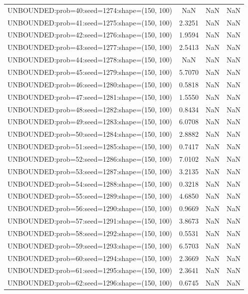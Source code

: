 \begin{longtable}{lccc}
UNBOUNDED:prob=40:seed=1274:shape=(150, 100)  &     NaN &   NaN &    NaN \\
UNBOUNDED:prob=41:seed=1275:shape=(150, 100)  &  2.3251 &   NaN &    NaN \\
UNBOUNDED:prob=42:seed=1276:shape=(150, 100)  &  1.9594 &   NaN &    NaN \\
UNBOUNDED:prob=43:seed=1277:shape=(150, 100)  &  2.5413 &   NaN &    NaN \\
UNBOUNDED:prob=44:seed=1278:shape=(150, 100)  &     NaN &   NaN &    NaN \\
UNBOUNDED:prob=45:seed=1279:shape=(150, 100)  &  5.7070 &   NaN &    NaN \\
UNBOUNDED:prob=46:seed=1280:shape=(150, 100)  &  0.5818 &   NaN &    NaN \\
UNBOUNDED:prob=47:seed=1281:shape=(150, 100)  &  1.5550 &   NaN &    NaN \\
UNBOUNDED:prob=48:seed=1282:shape=(150, 100)  &  0.8434 &   NaN &    NaN \\
UNBOUNDED:prob=49:seed=1283:shape=(150, 100)  &  6.0708 &   NaN &    NaN \\
UNBOUNDED:prob=50:seed=1284:shape=(150, 100)  &  2.8882 &   NaN &    NaN \\
UNBOUNDED:prob=51:seed=1285:shape=(150, 100)  &  0.7417 &   NaN &    NaN \\
UNBOUNDED:prob=52:seed=1286:shape=(150, 100)  &  7.0102 &   NaN &    NaN \\
UNBOUNDED:prob=53:seed=1287:shape=(150, 100)  &  3.2135 &   NaN &    NaN \\
UNBOUNDED:prob=54:seed=1288:shape=(150, 100)  &  0.3218 &   NaN &    NaN \\
UNBOUNDED:prob=55:seed=1289:shape=(150, 100)  &  4.6850 &   NaN &    NaN \\
UNBOUNDED:prob=56:seed=1290:shape=(150, 100)  &  0.9669 &   NaN &    NaN \\
UNBOUNDED:prob=57:seed=1291:shape=(150, 100)  &  3.8673 &   NaN &    NaN \\
UNBOUNDED:prob=58:seed=1292:shape=(150, 100)  &  0.5531 &   NaN &    NaN \\
UNBOUNDED:prob=59:seed=1293:shape=(150, 100)  &  6.5703 &   NaN &    NaN \\
UNBOUNDED:prob=60:seed=1294:shape=(150, 100)  &  2.3669 &   NaN &    NaN \\
UNBOUNDED:prob=61:seed=1295:shape=(150, 100)  &  2.3641 &   NaN &    NaN \\
UNBOUNDED:prob=62:seed=1296:shape=(150, 100)  &  0.6745 &   NaN &    NaN \\

\end{longtable}
